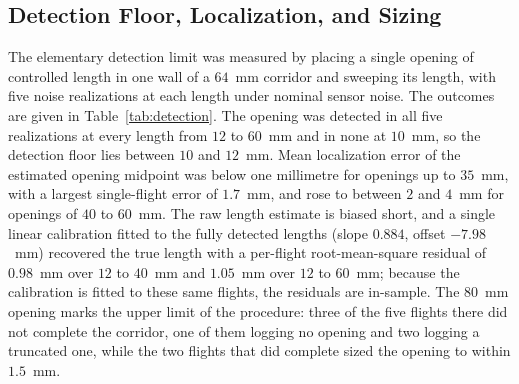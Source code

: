 \documentclass[final,5p,times]{elsarticle}
\begin{document}
\subsection{Detection Floor, Localization, and Sizing}
\label{sec:results_detection}

The elementary detection limit was measured by placing a single opening of controlled length in one wall of a $64$~mm corridor and sweeping its length, with five noise realizations at each length under nominal sensor noise. The outcomes are given in Table~\ref{tab:detection}. The opening was detected in all five realizations at every length from $12$ to $60$~mm and in none at $10$~mm, so the detection floor lies between $10$ and $12$~mm. Mean localization error of the estimated opening midpoint was below one millimetre for openings up to $35$~mm, with a largest single-flight error of $1.7$~mm, and rose to between $2$ and $4$~mm for openings of $40$ to $60$~mm. The raw length estimate is biased short, and a single linear calibration fitted to the fully detected lengths (slope $0.884$, offset $-7.98$~mm) recovered the true length with a per-flight root-mean-square residual of $0.98$~mm over $12$ to $40$~mm and $1.05$~mm over $12$ to $60$~mm; because the calibration is fitted to these same flights, the residuals are in-sample. The $80$~mm opening marks the upper limit of the procedure: three of the five flights there did not complete the corridor, one of them logging no opening and two logging a truncated one, while the two flights that did complete sized the opening to within $1.5$~mm.
\end{document}
